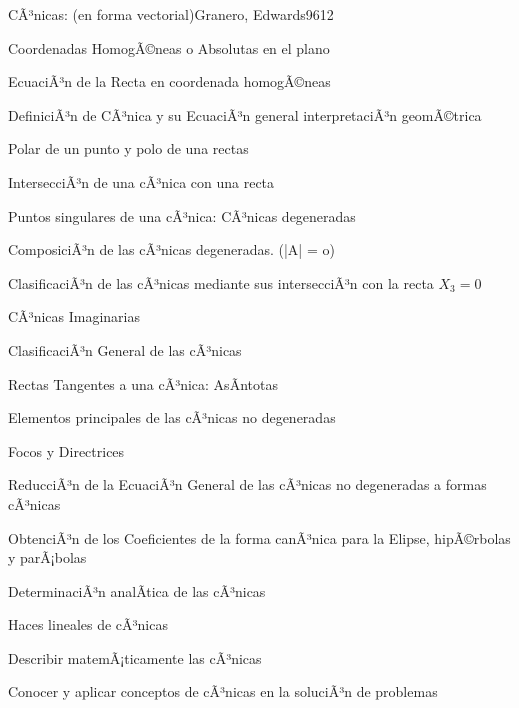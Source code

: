 \begin{syllabus}
\begin{unit}{CÃ³nicas: (en forma vectorial)}{Granero, Edwards96}{12}
\begin{topics}
      	\item Coordenadas HomogÃ©neas o Absolutas en el plano
	\item EcuaciÃ³n de la Recta en coordenada homogÃ©neas
	\item DefiniciÃ³n de CÃ³nica y su EcuaciÃ³n general interpretaciÃ³n geomÃ©trica
	\item Polar de un punto y polo de una  rectas
	\item IntersecciÃ³n de una cÃ³nica con una recta
	\item Puntos singulares de una cÃ³nica: CÃ³nicas degeneradas
	\item ComposiciÃ³n de las cÃ³nicas degeneradas. (|A| = o)
	\item ClasificaciÃ³n de las cÃ³nicas mediante sus intersecciÃ³n con la recta $X_3 = 0$
	\item CÃ³nicas Imaginarias
	\item ClasificaciÃ³n General de las cÃ³nicas
	\item Rectas Tangentes a una cÃ³nica: AsÃ­ntotas
	\item Elementos principales de las cÃ³nicas no degeneradas
	\item Focos y Directrices
	\item ReducciÃ³n de la EcuaciÃ³n General de las cÃ³nicas no degeneradas a formas cÃ³nicas
	\item ObtenciÃ³n de los Coeficientes de la forma canÃ³nica para la Elipse, hipÃ©rbolas y parÃ¡bolas
	\item DeterminaciÃ³n analÃ­tica de las cÃ³nicas
	\item Haces lineales de cÃ³nicas
   \end{topics}

   \begin{unitgoals}
      \item Describir matemÃ¡ticamente las cÃ³nicas
      \item Conocer y aplicar conceptos de cÃ³nicas en la soluciÃ³n de problemas
   \end{unitgoals}
\end{unit}

\begin{coursebibliography}
\end{coursebibliography}
\end{syllabus}
